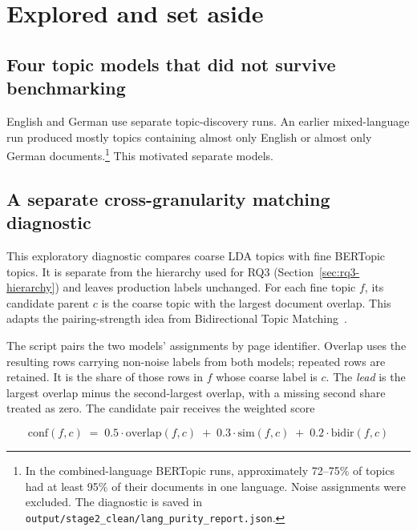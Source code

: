 \section{Explored and set aside}
\label{sec:setaside}

\subsection{Four topic models that did not survive benchmarking}
\label{sec:setaside-models}

English and German use separate topic-discovery runs. \measured{} An earlier mixed-language run
produced mostly topics containing almost only English or almost only German documents.\footnote{
In the combined-language BERTopic runs, approximately 72--75\% of topics
had at least 95\% of their documents in one language. Noise assignments were excluded.
The diagnostic is saved in \texttt{output/stage2\_clean/}\allowbreak\texttt{lang\_purity\_report.json}.}
This motivated separate models.

\subsection{A separate cross-granularity matching diagnostic}
\label{sec:method-crossgran}

This exploratory diagnostic compares coarse LDA topics with fine BERTopic topics. It is
separate from the hierarchy used for RQ3 (Section~\ref{sec:rq3-hierarchy}) and leaves production
labels unchanged. For each fine topic $f$, its candidate parent $c$ is the coarse topic with
the largest document overlap. This adapts the pairing-strength idea from Bidirectional Topic
Matching~\cite[p.~4, Eq.~(1)]{adam2024btm}.

The script pairs the two models' assignments by page identifier. Overlap uses the resulting
rows carrying non-noise labels from both models; repeated rows are retained. It is the share
of those rows in $f$ whose coarse label is $c$.
The \emph{lead} is the largest overlap minus the second-largest overlap, with a missing
second share treated as zero. The candidate pair receives the weighted score

\begin{equation}
\mathrm{conf}(f, c) \;=\; 0.5 \cdot \mathrm{overlap}(f,c) \;+\; 0.3 \cdot \mathrm{sim}(f,c)
\;+\; 0.2 \cdot \mathrm{bidir}(f,c)
\end{equation}

